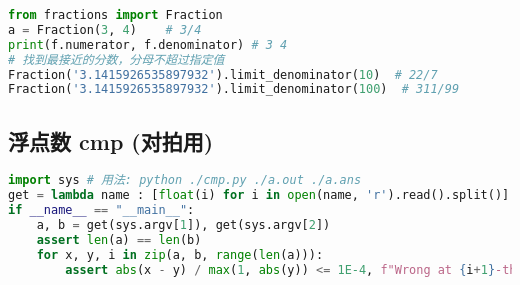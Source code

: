 \documentclass[a4paper,landscape,twocolumn]{ctexart}
\begin{document}
\begin{lstlisting}[language=python]
from fractions import Fraction
a = Fraction(3, 4)    # 3/4
print(f.numerator, f.denominator) # 3 4
# 找到最接近的分数，分母不超过指定值
Fraction('3.1415926535897932').limit_denominator(10)  # 22/7
Fraction('3.1415926535897932').limit_denominator(100)  # 311/99
\end{lstlisting}

\subsection{浮点数 cmp (对拍用)}

\begin{lstlisting}[language=python]
import sys # 用法: python ./cmp.py ./a.out ./a.ans
get = lambda name : [float(i) for i in open(name, 'r').read().split()]
if __name__ == "__main__":
	a, b = get(sys.argv[1]), get(sys.argv[2])
	assert len(a) == len(b)
	for x, y, i in zip(a, b, range(len(a))):
		assert abs(x - y) / max(1, abs(y)) <= 1E-4, f"Wrong at {i+1}-th"
\end{lstlisting}

%


%
%
\end{document}
